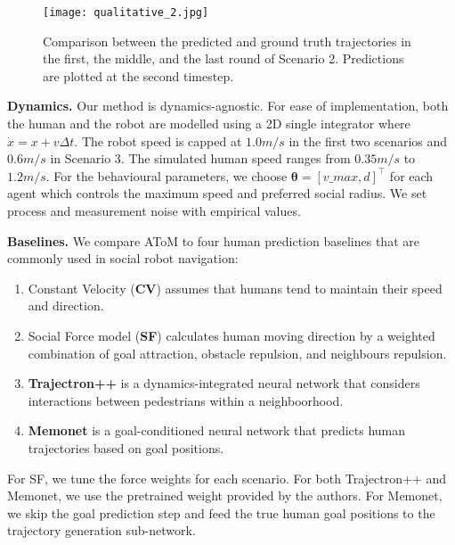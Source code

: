\begin{figure}
    \centering
    \texttt{[image: qualitative\_2.jpg]}
    \vspace{-3mm}
    \caption{Comparison between the predicted and ground truth trajectories in the first, the middle, and the last round of Scenario 2. Predictions are plotted at the second timestep.}
    \vspace{-5mm}
    \label{fig:qualitative_2}
\end{figure}


\textbf{Dynamics.}
Our method is dynamics-agnostic. For ease of implementation, both the human and the robot are modelled using a 2D single integrator where $\dot{x} = x + v\Delta t$. The robot speed is capped at $1.0m/s$ in the first two scenarios and $0.6m/s$ in Scenario 3. The simulated human speed ranges from $0.35m/s$ to $1.2m/s$. For the behavioural parameters, we choose $\boldsymbol{\theta} = [v\_max, d]^\top$ for each agent which controls the maximum speed and preferred social radius. We set process and measurement noise with empirical values.

\textbf{Baselines.}
We compare AToM to four human prediction baselines that are commonly used in social robot navigation:
\begin{enumerate}
    \item Constant Velocity (\textbf{CV}) assumes that humans tend to maintain their speed and direction.
    \item Social Force model (\textbf{SF}) \cite{helbing1995social} calculates human moving direction by a weighted combination of goal attraction, obstacle repulsion, and neighbours repulsion.
    \item \textbf{Trajectron++} \cite{salzmann2020trajectron++} is a dynamics-integrated neural network that considers interactions between pedestrians within a neighboorhood.
    \item \textbf{Memonet} \cite{xu2022remember} is a goal-conditioned neural network that predicts human trajectories based on goal positions.
\end{enumerate}
For SF, we tune the force weights for each scenario. For both Trajectron++ and Memonet, we use the pretrained weight provided by the authors. For Memonet, we skip the goal prediction step and feed the true human goal positions to the trajectory generation sub-network.

